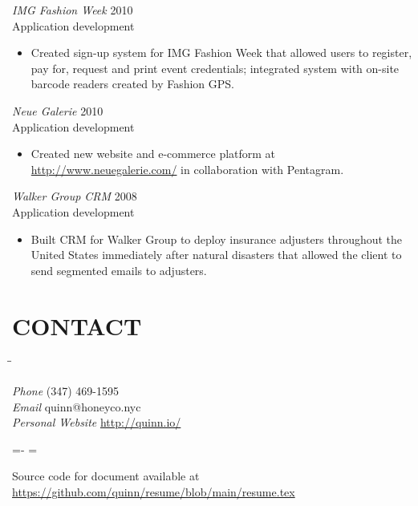 \documentclass[line,margin]{res}
\begin{document}
\begin{resume}
    {\sl IMG Fashion Week}
    \hfill 2010 \\
    Application development
    \begin{itemize} \itemsep -2pt
        \item
              Created sign-up system for IMG Fashion Week that allowed users to
              register, pay for, request and print event credentials; integrated
              system with on-site barcode readers created by Fashion GPS.
    \end{itemize}

    {\sl Neue Galerie}
    \hfill 2010 \\
    Application development
    \begin{itemize} \itemsep -2pt
        \item
              Created new website and e-commerce platform at
              \mbox{\url{http://www.neuegalerie.com/}} in collaboration with
              Pentagram.

    \end{itemize}

    \begin{samepage}
        {\sl Walker Group CRM}
        \hfill 2008 \\
        Application development
        \begin{itemize} \itemsep -2pt
            \item
                  Built CRM for Walker Group to deploy insurance adjusters
                  throughout the United States immediately after natural disasters
                  that allowed the client to send segmented emails to adjusters.

        \end{itemize}
    \end{samepage}

    \section{CONTACT}
    \vspace{-2.3ex}
    \begin{tabbing}
        \hspace{1.5in}\= \hspace{2.0in}\= \kill

        {\sl Phone}            \> (347) 469-1595 \\
        {\sl Email}            \> quinn@honeyco.nyc \\
        {\sl Personal Website} \> \url{http://quinn.io/} \\

    \end{tabbing}

    \vfill
    \leftskip=-\hoffset
    \advance\textwidth\hoffset
    \hsize=\textwidth
    \fullline
    \vskip 2pt

    Source code for document available at
    \url{https://github.com/quinn/resume/blob/main/resume.tex}

\end{resume}
\end{document}
